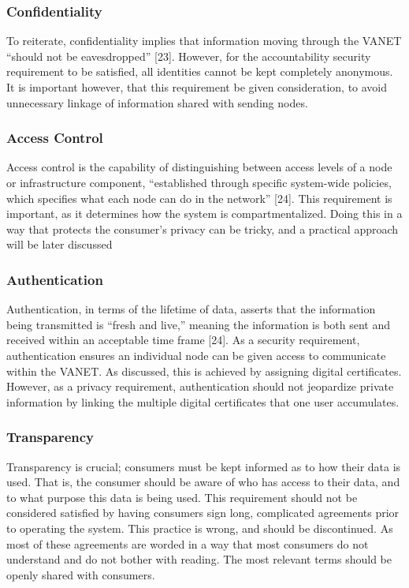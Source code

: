 \documentclass[conference,compsoc]{IEEEtran}
\begin{document}
\subsubsection{Confidentiality}
To reiterate, confidentiality implies that information moving through the VANET “should not be eavesdropped” [23]. However, for the accountability security requirement to be satisfied, all identities cannot be kept completely anonymous. It is important however, that this requirement be given consideration, to avoid unnecessary linkage of information shared with sending nodes.

\subsubsection{Access Control}
Access control is the capability of distinguishing between access levels of a node or infrastructure component, “established through specific system-wide policies, which specifies what each node can do in the network” [24]. This requirement is important, as it determines how the system is compartmentalized. Doing this in a way that protects the consumer’s privacy can be tricky, and a practical approach will be later discussed

\subsubsection{Authentication}
Authentication, in terms of the lifetime of data, asserts that the information being transmitted is “fresh and live,” meaning the information is both sent and received within an acceptable time frame [24]. As a security requirement, authentication ensures an individual node can be given access to communicate within the VANET. As discussed, this is achieved by assigning digital certificates. However, as a privacy requirement, authentication should not jeopardize private information by linking the multiple digital certificates that one user accumulates.

\subsubsection{Transparency}
Transparency is crucial; consumers must be kept informed as to how their data is used. That is, the consumer should be aware of who has access to their data, and to what purpose this data is being used. This requirement should not be considered satisfied by having consumers sign long, complicated agreements prior to operating the system. This practice is wrong, and should be discontinued. As most of these agreements are worded in a way that most consumers do not understand and do not bother with reading. The most relevant terms should be openly shared with consumers. 
\end{document}
